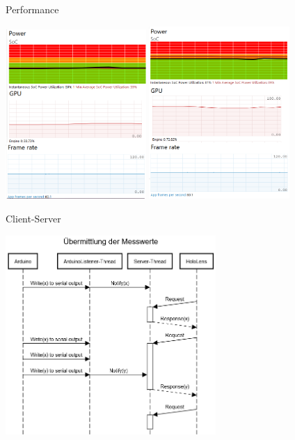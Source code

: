 \begin{frame}[fragile]{Performance}
\vspace{-1em}
\begin{center}
	\includegraphics[width=0.4\textwidth]{images/performance/perf_msaa_off_cut.png}
	\hspace{0.05cm}
	\includegraphics[width=0.4\textwidth]{images/performance/perf_msaa_on_cut.png}
\end{center}
\end{frame}

\begin{frame}[fragile]{Client-Server}
\vspace{-1em}
\begin{center}
	\includegraphics[width=0.6\textwidth]{images/schema/Sequenzdiagramm.png}
\end{center}
\end{frame}